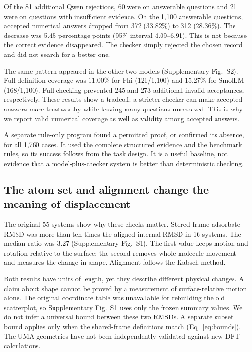 Of the 81 additional Qwen rejections, 60 were on answerable questions and 21 were on questions with insufficient evidence. On the 1,100 answerable questions, accepted numerical answers dropped from 372 (33.82\%) to 312 (28.36\%). The decrease was 5.45 percentage points (95\% interval 4.09--6.91). This is not because the correct evidence disappeared. The checker simply rejected the chosen record and did not search for a better one.

The same pattern appeared in the other two models (Supplementary Fig.~S2). Full-definition coverage was 11.00\% for Phi (121/1,100) and 15.27\% for SmolLM (168/1,100). Full checking prevented 245 and 273 additional invalid acceptances, respectively. These results show a tradeoff: a stricter checker can make accepted answers more trustworthy while leaving many questions unresolved. This is why we report valid numerical coverage as well as validity among accepted answers.

A separate rule-only program found a permitted proof, or confirmed its absence, for all 1,760 cases. It used the complete structured evidence and the benchmark rules, so its success follows from the task design. It is a useful baseline, not evidence that a model-plus-checker system is better than deterministic checking.

\subsection{The atom set and alignment change the meaning of displacement}
\label{sec:physical_results}

The original 55 systems show why these checks matter. Stored-frame adsorbate RMSD was more than ten times the aligned internal RMSD in 16 systems. The median ratio was 3.27 (Supplementary Fig.~S1). The first value keeps motion and rotation relative to the surface; the second removes whole-molecule movement and measures the change in shape. Alignment follows the Kabsch method.\cite{kabsch1978discussion}

Both results have units of length, yet they describe different physical changes. A claim about shape cannot be proved by a measurement of surface-relative motion alone. The original coordinate table was unavailable for rebuilding the old scatterplot, so Supplementary Fig.~S1 uses only the frozen summary values. We do not infer a universal bound between these two RMSDs. A separate subset bound applies only when the shared-frame definitions match (Eq.~\ref{eq:bounds}). The UMA geometries have not been independently validated against new DFT calculations.\cite{wood2025uma}

